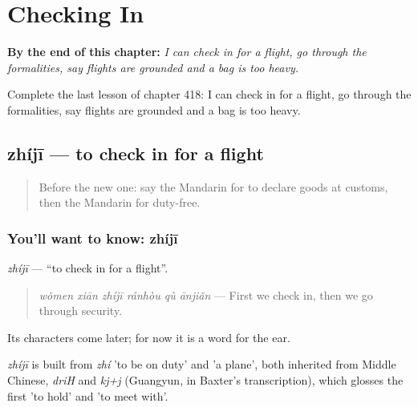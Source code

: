 
\chapter{Checking In}
\label{ch:zh-checking-in}

\begin{chapteropening}
\textbf{By the end of this chapter:} \emph{I can check in for a flight, go through the formalities, say flights are grounded and a bag is too heavy.}

Complete the last lesson of chapter 418: I can check in for a flight, go through the formalities, say flights are grounded and a bag is too heavy.
\end{chapteropening}

\section[zhíjī]{zhíjī — to check in for a flight}

\label{lesson:ZH-C418-zhiji}



\begin{quote}
Before the new one: say the Mandarin for to declare goods at customs, then the Mandarin for duty-free.
\end{quote}

\subsection*{You'll want to know: zhíjī}
\emph{zhíjī} — \textquotedblleft{}to check in for a flight\textquotedblright{}.

\begin{quote}
\emph{wǒmen xiān zhíjī ránhòu qù ānjiǎn} — First we check in, then we go through security.
\end{quote}

Its characters come later; for now it is a word for the ear.

\begin{cousinweb}
\emph{zhíjī} is built from \emph{zhí} 'to be on duty' and  'a plane', both inherited from Middle Chinese, \emph{driH} and \emph{kj+j} (Guangyun, in Baxter's transcription), which glosses the first 'to hold' and 'to meet with'.
\end{cousinweb}

